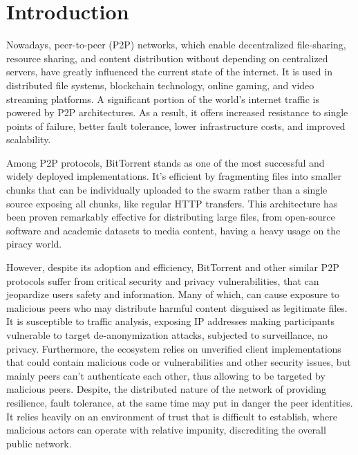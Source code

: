 \chapter{Introduction}
\label{Introduction}

Nowadays, peer-to-peer (P2P) networks, which enable decentralized file-sharing, resource sharing, and content distribution without depending on centralized servers, have greatly influenced the current state of the internet. It is used in distributed file systems, blockchain technology, online gaming, and video streaming platforms. A significant portion of the world's internet traffic is powered by P2P architectures. As a result, it offers increased resistance to single points of failure, better fault tolerance, lower infrastructure costs, and improved scalability.

Among P2P protocols, BitTorrent stands as one of the most successful and widely deployed implementations. It's efficient by fragmenting files into smaller chunks that can be individually uploaded to the swarm rather than a single source exposing all chunks, like regular HTTP transfers. This architecture has been proven remarkably effective for distributing large files, from open-source software and academic datasets to media content, having a heavy usage on the piracy world.

However, despite its adoption and efficiency, BitTorrent and other similar P2P protocols suffer from critical security and privacy vulnerabilities, that can jeopardize users safety and information. Many of which, can cause exposure to malicious peers who may distribute harmful content disguised as legitimate files. It is susceptible to traffic analysis, exposing IP addresses making participants vulnerable to target de-anonymization attacks, subjected to surveillance, no privacy. Furthermore, the ecosystem relies on unverified client implementations that could contain malicious code or vulnerabilities and other security issues, but mainly peers can't authenticate each other, thus allowing to be targeted by malicious peers. Despite, the distributed nature of the network of providing resilience, fault tolerance, at the same time may put in danger the peer identities. It relies heavily on an environment of trust that is difficult to establish, where malicious actors can operate with relative impunity, discrediting the overall public network.

